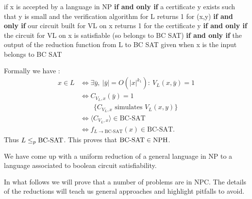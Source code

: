 
if x is accepted by a language in NP \textbf{if and only if}  a certificate y exists such that y is small and the verification algorithm for L returns 1 for (x,y) \textbf{if and only if} our circuit built for VL on x returns 1 for the certificate y  \textbf{if and only if} the circuit for VL on x is satisfiable (so belongs to BC SAT)  \textbf{if and only if} the output of the reduction function from L to BC SAT given when x is the input belongs to BC SAT 

Formally we have :
\[
\begin{aligned}
x\in L&\Longleftrightarrow\exists\bar y,\ |\bar y|=O(|x|^{k_1}):\ V_L(x,\bar y)=1\\
&\Longleftrightarrow C_{V_L,x}(\bar y)=1\\
&\qquad\{C_{V_L,x}\text{ simulates }V_L(x,y)\}\\
&\Longleftrightarrow\langle C_{V_L,x}\rangle\in\mathrm{BC\text{-}SAT}\\
&\Longleftrightarrow f_{L\to\mathrm{BC\text{-}SAT}}(x)\in\mathrm{BC\text{-}SAT}.
\end{aligned}
\]
Thus $L\leq_p\mathrm{BC\text{-}SAT}$.
This proves that $\mathrm{BC\text{-}SAT}\in\mathrm{NPH}$.

We have come up with a uniform reduction of a general language in NP to a language associated to boolean circuit satisfiability. 

In what follows we will prove that a number of problems are in NPC. The details of the reductions will teach us general approaches and highlight pitfalls to avoid.
